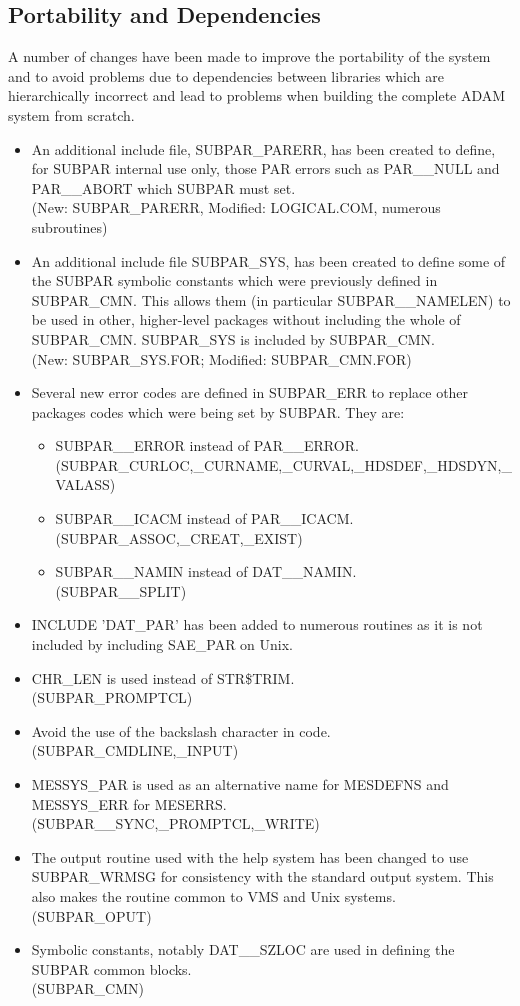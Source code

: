 \subsection{Portability and Dependencies}
A number of changes have been made to improve the portability of the system
and to avoid problems due to dependencies between libraries which are
hierarchically incorrect and lead to problems when building the complete
ADAM system from scratch. 
\begin{itemize}
\item An additional include file, SUBPAR\_PARERR, has been created
to define, for SUBPAR internal use only, those PAR errors such as PAR\_\_NULL 
and PAR\_\_ABORT which SUBPAR must set.\\
(New: SUBPAR\_PARERR,  Modified: LOGICAL.COM, numerous subroutines)
\item An additional include file SUBPAR\_SYS, has been created to define some
of the SUBPAR symbolic constants which were previously defined in SUBPAR\_CMN.
This allows them (in particular SUBPAR\_\_NAMELEN) to be used in other,
higher-level packages without including the whole of SUBPAR\_CMN.
SUBPAR\_SYS is included by SUBPAR\_CMN.\\
(New: SUBPAR\_SYS.FOR; Modified: SUBPAR\_CMN.FOR)
\item Several new error codes are defined in SUBPAR\_ERR to replace other
packages codes which were being set by SUBPAR. They are:
\begin{itemize} 
\item SUBPAR\_\_ERROR instead of PAR\_\_ERROR.\\
(SUBPAR\_CURLOC,\_CURNAME,\_CURVAL,\_HDSDEF,\_HDSDYN,\_VALASS)
\item SUBPAR\_\_ICACM instead of PAR\_\_ICACM.\\
(SUBPAR\_ASSOC,\_CREAT,\_EXIST)
\item SUBPAR\_\_NAMIN instead of DAT\_\_NAMIN.\\
(SUBPAR\_\_SPLIT)
\end{itemize}
\item INCLUDE 'DAT\_PAR' has been added to numerous routines as it is not
included by including SAE\_PAR on Unix.
\item CHR\_LEN is used instead of STR\$TRIM.\\
(SUBPAR\_PROMPTCL)
\item Avoid the use of the backslash character in code.\\
(SUBPAR\_CMDLINE,\_INPUT)
\item MESSYS\_PAR is used as an alternative  name for MESDEFNS and MESSYS\_ERR
for MESERRS.\\
(SUBPAR\_\_SYNC,\_PROMPTCL,\_WRITE)
\item The output routine used with the help system has been changed to use
SUBPAR\_WRMSG for consistency with the standard output system. 
This also makes the routine common to VMS and Unix systems.\\
(SUBPAR\_OPUT)
\item Symbolic constants, notably DAT\_\_SZLOC are used in defining the SUBPAR
common blocks.\\
(SUBPAR\_CMN)
\end{itemize}

